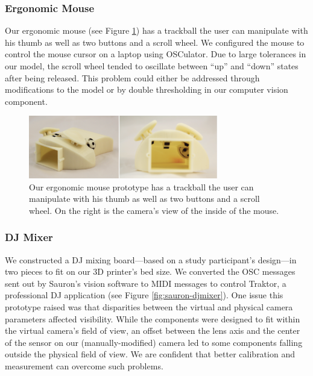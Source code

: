         \subsubsection{Ergonomic Mouse}
        Our ergonomic mouse (see Figure \ref{fig:sauron-ergomouse}) has a trackball the user can manipulate with his thumb as well as two buttons and a scroll wheel. We configured the mouse to control the mouse cursor on a laptop using OSCulator. Due to large tolerances in our model, the scroll wheel tended to oscillate between ``up'' and ``down'' states after being released. This problem could either be addressed through modifications to the model or by double thresholding in our computer vision component.
        
        
\begin{figure}
\centering
\includegraphics[width=3.25in]{figures/sauron/ergomouse.png}
\caption{Our ergonomic mouse prototype has a trackball the user can manipulate with his thumb as well as two buttons and a scroll wheel. On the right is the camera's view of the inside of the mouse.}
\label{fig:sauron-ergomouse}
\end{figure}

        \subsubsection{DJ Mixer}
        We constructed a DJ mixing board---based on a study participant's design---in two pieces to fit on our 3D printer's bed size. We converted the OSC messages sent out by Sauron's vision software to MIDI messages to control Traktor, a professional DJ application (see Figure \ref{fig:sauron-djmixer}). One issue this prototype raised was that disparities between the virtual and physical camera parameters affected visibility. While the components were designed to fit within the virtual camera's field of view, an offset between the lens axis and the center of the sensor on our (manually-modified) camera led to some components falling outside the physical field of view. We are confident that better calibration and measurement can overcome such problems.
        
